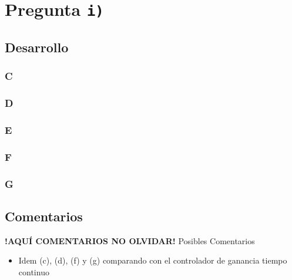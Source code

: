 \section{Pregunta \texttt{i)}}\label{pregunta-i}
\subsection{Desarrollo}


\subsubsection{C} %

\FloatBarrier
\subsubsection{D}%

\FloatBarrier
\subsubsection{E}%

\FloatBarrier
\subsubsection{F}%

\FloatBarrier
\subsubsection{G}%


\FloatBarrier
\subsection{Comentarios}


\textbf{!AQUÍ COMENTARIOS NO OLVIDAR!}
Posibles Comentarios
\begin{itemize}
    \item Idem (c), (d), (f) y (g) comparando con el controlador de ganancia tiempo continuo
\end{itemize}